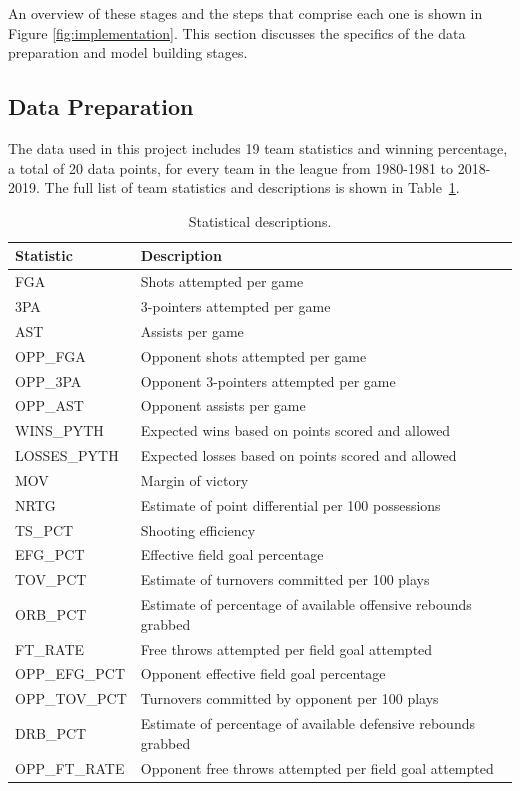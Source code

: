 \documentclass[pageno]{jpaper}
\begin{document}
An overview of these stages and the steps that comprise each one is shown in Figure \ref{fig:implementation}. This section discusses the specifics of the data preparation and model building stages.

\subsection{Data Preparation}

The data used in this project includes 19 team statistics and winning percentage, a total of 20 data points, for every team in the league from 1980-1981 to 2018-2019. The full list of team statistics and descriptions is shown in Table~\ref{table:statistics}.

\begin{table}[hbt]
  \centering
  \begin{tabular}{|l|l|}
    \hline
    \textbf{Statistic} & \textbf{Description}\\
    \hline
    FGA & Shots attempted per game\\
    \hline
    3PA & 3-pointers attempted per game\\
    \hline
    AST & Assists per game\\
    \hline
    OPP\_FGA & Opponent shots attempted per game\\
    \hline
    OPP\_3PA & Opponent 3-pointers attempted per game\\
    \hline
    OPP\_AST & Opponent assists per game\\
    \hline
    WINS\_PYTH & Expected wins based on points scored and allowed \\
    \hline
    LOSSES\_PYTH & Expected losses based on points scored and allowed\\
    \hline
    MOV & Margin of victory\\
    \hline
    NRTG & Estimate of point differential per 100 possessions\\
    \hline
    TS\_PCT & Shooting efficiency\\
    \hline
    EFG\_PCT & Effective field goal percentage\\
    \hline
    TOV\_PCT & Estimate of turnovers committed per 100 plays\\
    \hline
    ORB\_PCT & Estimate of percentage of available offensive rebounds grabbed\\
    \hline
    FT\_RATE & Free throws attempted per field goal attempted\\
    \hline
    OPP\_EFG\_PCT & Opponent effective field goal percentage\\
    \hline
    OPP\_TOV\_PCT & Turnovers committed by opponent per 100 plays\\
    \hline
    DRB\_PCT & Estimate of percentage of available defensive rebounds grabbed\\
    \hline
    OPP\_FT\_RATE & Opponent free throws attempted per field goal attempted\\
    \hline
  \end{tabular}
  \caption{Statistical descriptions.}
  \label{table:statistics}
\end{table}
\end{document}
